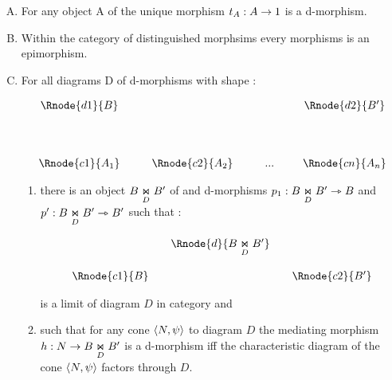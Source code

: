 \documentclass[10pt,a4paper]{scrartcl}
\begin{document}
\begin{enumerate} [A.,leftmargin=0.5cm]
	\item 
	  For any object A of  the unique morphism $t_A:A \morph 1$ is a d-morphism.
	\item 
	 Within the category of distinguished morphsims every morphisms is an epimorphism.
	\item
	For all diagrams D of d-morphisms with shape \ndidly:
	
\begin{center}
\begin{displaymath}
\begin{array}{cp{0.3cm}c         p{0.3cm}  c p{0.2cm} c}
\Rnode{d1}{B}& &               & &     & &\Rnode{d2}{B'}  \\ [1.4cm]
\Rnode{c1}{A_1}& &\Rnode{c2}{A_2}& & ... & &\Rnode{cn}{A_n}
\end{array}
\end{displaymath}
\end{center}

\begin{enumerate}[label*=\arabic*]
\item
{}
there is an object  $ \fibrex{B}{B'}{D}$ of  and d-morphisms 
$p_1: \fibrex{B}{B'}{D} \smorph B$ and  $p': \fibrex{B}{B'}{D} \smorph B'$ such that :

\begin{center}
\begin{displaymath}
\begin{array}{cp{0cm}cp{0cm} c}
            & &\Rnode{d}{\fibrex{B}{B'}{D}}                  \\ [0.6cm]
\Rnode{c1}{B}& &                & & \Rnode{c2}{B'} 
\end{array}
\end{displaymath}
\end{center}

is a limit of diagram $D$ in category  and 
\item 
{}
such that for any cone $\tuple{N,\psi}$ to diagram $D$
the mediating morphism $h: N \morph B \underset{D}{\Join} B'$ is a d-morphism iff 
the characteristic diagram of the cone $\tuple{N,\psi}$ factors through $D$.



\end{enumerate}
\end{enumerate}
\end{document}
